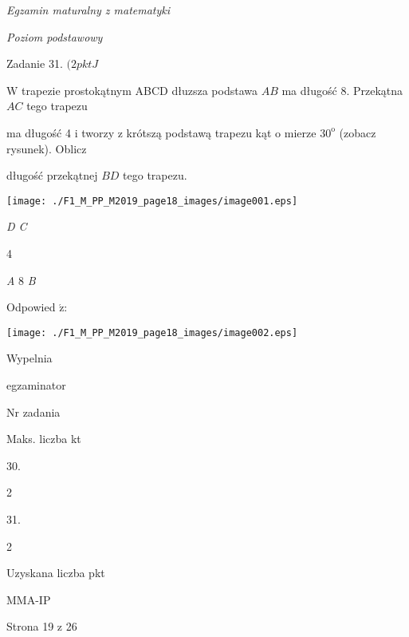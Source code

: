 \documentclass[a4paper,12pt]{article}
\begin{document}
{\it Egzamin maturalny z matematyki}

{\it Poziom podstawowy}

Zadanie 31. $(2pktJ$

$\mathrm{W}$ trapezie prostokątnym ABCD dłuzsza podstawa $AB$ ma długość 8. Przekątna $AC$ tego trapezu

ma długość 4 i tworzy z krótszą podstawą trapezu kąt o mierze $30^{\mathrm{o}}$ (zobacz rysunek). Oblicz

długość przekątnej $BD$ tego trapezu.
\begin{center}
\texttt{[image: ./F1\_M\_PP\_M2019\_page18\_images/image001.eps]}
\end{center}
{\it D  C}

4

{\it A}  8  {\it B}

Odpowied $\acute{\mathrm{z}}$:
\begin{center}
\texttt{[image: ./F1\_M\_PP\_M2019\_page18\_images/image002.eps]}
\end{center}
Wypelnia

egzaminator

Nr zadania

Maks. liczba kt

30.

2

31.

2

Uzyskana liczba pkt

MMA-IP

Strona 19 z 26
\end{document}
